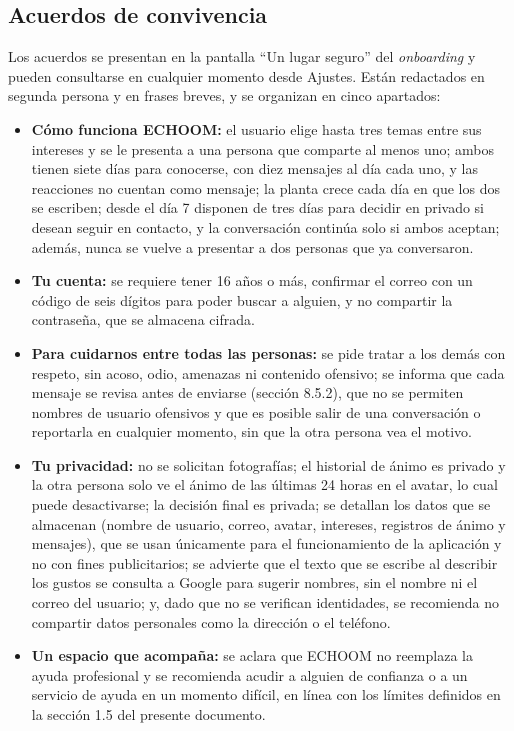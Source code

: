 \subsection{Acuerdos de convivencia}
Los acuerdos se presentan en la pantalla ``Un lugar seguro'' del \textit{onboarding} y pueden consultarse en cualquier momento desde Ajustes. Están redactados en segunda persona y en frases breves, y se organizan en cinco apartados:

\begin{itemize}
    \item \textbf{Cómo funciona ECHOOM:} el usuario elige hasta tres temas entre sus intereses y se le presenta a una persona que comparte al menos uno; ambos tienen siete días para conocerse, con diez mensajes al día cada uno, y las reacciones no cuentan como mensaje; la planta crece cada día en que los dos se escriben; desde el día 7 disponen de tres días para decidir en privado si desean seguir en contacto, y la conversación continúa solo si ambos aceptan; además, nunca se vuelve a presentar a dos personas que ya conversaron.
    \item \textbf{Tu cuenta:} se requiere tener 16 años o más, confirmar el correo con un código de seis dígitos para poder buscar a alguien, y no compartir la contraseña, que se almacena cifrada.
    \item \textbf{Para cuidarnos entre todas las personas:} se pide tratar a los demás con respeto, sin acoso, odio, amenazas ni contenido ofensivo; se informa que cada mensaje se revisa antes de enviarse (sección 8.5.2), que no se permiten nombres de usuario ofensivos y que es posible salir de una conversación o reportarla en cualquier momento, sin que la otra persona vea el motivo.
    \item \textbf{Tu privacidad:} no se solicitan fotografías; el historial de ánimo es privado y la otra persona solo ve el ánimo de las últimas 24 horas en el avatar, lo cual puede desactivarse; la decisión final es privada; se detallan los datos que se almacenan (nombre de usuario, correo, avatar, intereses, registros de ánimo y mensajes), que se usan únicamente para el funcionamiento de la aplicación y no con fines publicitarios; se advierte que el texto que se escribe al describir los gustos se consulta a Google para sugerir nombres, sin el nombre ni el correo del usuario; y, dado que no se verifican identidades, se recomienda no compartir datos personales como la dirección o el teléfono.
    \item \textbf{Un espacio que acompaña:} se aclara que ECHOOM no reemplaza la ayuda profesional y se recomienda acudir a alguien de confianza o a un servicio de ayuda en un momento difícil, en línea con los límites definidos en la sección 1.5 del presente documento.
\end{itemize}

